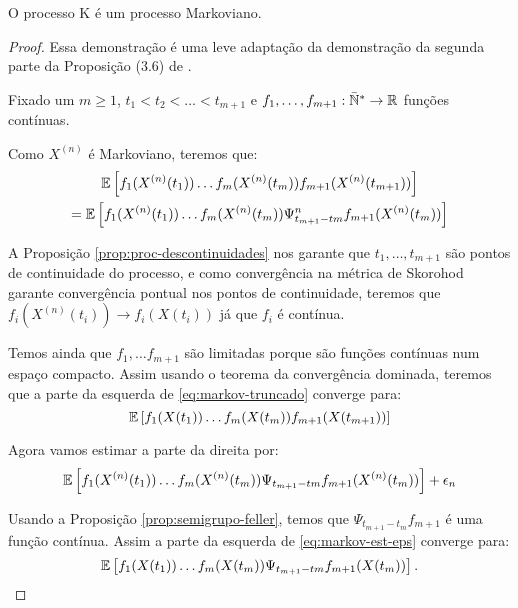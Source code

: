\begin{teorema}
  \label{teo:proc_markov}
  O processo K é um processo Markoviano.
\end{teorema}

\begin{proof}

  Essa demonstração é uma leve adaptação da demonstração da segunda
  parte da Proposição (3.6) de \cite{fontes:08}.

  Fixado um $m \geq 1$, $t_1 < t_2 < \ldots < t_{m+1}$ e $f_1, \ldots,
  f_{m+1} : {\mathbb{\bar{N}^*}} \to {\mathbb{R}}$ funções contínuas.

  Como $X^{(n)}$ é Markoviano, teremos que:
  \begin{gather}
    \label{eq:markov-truncado}
    {\mathbb{E}} \left[
      f_{1}(X^{(n)}(t_{1})) 
      \ldots
      f_{m}(X^{(n)}(t_{m})) 
      f_{m+1}(X^{(n)}(t_{m+1})) 
    \right] \notag\\
    = {\mathbb{E}} \left[
      f_{1}(X^{(n)}(t_{1})) 
      \ldots
      f_{m}(X^{(n)}(t_{m})) 
      \Psi^n_{t_{m+1} - t{m}} f_{m+1} (X^{(n)}(t_{m})) 
    \right]
  \end{gather}

  A Proposição \ref{prop:proc-descontinuidades} nos garante que \qc
  $t_1, \ldots, t_{m+1}$ são pontos de continuidade do processo, e
  como convergência na métrica de Skorohod garante convergência
  pontual nos pontos de continuidade, teremos que $f_i(X^{(n)}(t_i)) \to
  f_i(X(t_i))$ \qc já que $f_i$ é contínua.

  Temos ainda que $f_1, \ldots f_{m+1}$ são limitadas porque são
  funções contínuas num espaço compacto. Assim usando o teorema da
  convergência dominada, teremos que a parte da esquerda de
  \eqref{eq:markov-truncado} converge para:
  \begin{displaymath}
    {\mathbb{E}} \left[
      f_{1}(X(t_{1})) 
      \ldots
      f_{m}(X(t_{m})) 
      f_{m+1}(X(t_{m+1})) 
    \right]
  \end{displaymath}

  Agora vamos estimar a parte da direita por:
  \begin{equation}
    \label{eq:markov-est-eps}
    {\mathbb{E}} \left[
      f_{1}(X^{(n)}(t_{1})) 
      \ldots
      f_{m}(X^{(n)}(t_{m})) 
      \Psi_{t_{m+1} - t{m}} f_{m+1} (X^{(n)}(t_{m})) 
    \right] + \epsilon_n
  \end{equation}

  Usando a Proposição \ref{prop:semigrupo-feller}, temos que
  $\Psi_{t_{m+1}-t_m} f_{m+1}$ é uma função contínua. Assim a parte da
  esquerda de \eqref{eq:markov-est-eps} converge para:
  \begin{displaymath}
    {\mathbb{E}} \left[
      f_{1}(X(t_{1})) 
      \ldots
      f_{m}(X(t_{m})) 
      \Psi_{t_{m+1} - t{m}} f_{m+1} (X(t_{m})) 
    \right].
  \end{displaymath}


\end{proof}
